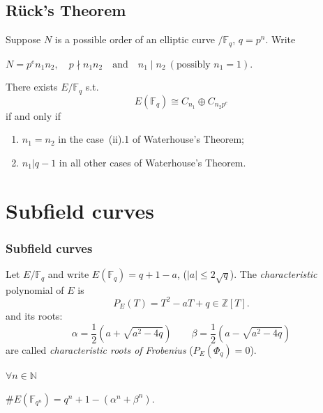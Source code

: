 \documentclass[10pt,handout]{beamer}%
\newcommand{\Z}{\mathbb Z}
\newcommand{\N}{\mathbb N}
\newcommand{\F}{\mathbb F}
\theoremstyle{definition}
\begin{document}
\begin{frame}[label=current]
\end{frame}

\subsection{R\"uck's Theorem}
\begin{frame}
\begin{theorem}[R\"uck]
Suppose $N$ is a possible order of an elliptic curve $/\F_q$,  $q=p^n$.  Write

\centerline{
$N = p^e n_1 n_2,\quad p\nmid n_1 n_2\quad\text{and}\quad n_1\mid n_2\ (\text{possibly }n_1 = 1).$}

There exists $E/\F_q$ s.t.
$$E(\F_q)\cong C_{n_1}\oplus C_{n_2p^e}$$
if and only if
\begin{enumerate}[<+-| alert@+>]
\item $n_1 = n_2$ in the case~(ii).1 of Waterhouse's Theorem;
\item $n_1 |q - 1$ in all other cases of  Waterhouse's Theorem.
\end{enumerate}
\end{theorem}\pause

\begin{example}
\end{example}
\end{frame}

\section{Subfield curves}
\begin{frame}\frametitle{Subfield curves}

\begin{definition}
Let $E/\F_q$ and write $E(\F_q)=q+1-a$, ($|a|\le2\sqrt{q}$). The \emph{characteristic}
polynomial of $E$ is
$$P_E(T)=T^2-aT+q\in\Z[T].$$
and its roots:
$$\alpha=\frac12\left(a+\sqrt{a^2-4q}\right)\qquad\beta=\frac12\left(a-\sqrt{a^2-4q}\right)$$
are called \emph{characteristic roots of Frobenius} ($P_E(\Phi_q)=0$).
\end{definition}

\begin{theorem} $\forall n\in\N$
\centerline{$\#E(\F_{q^n})=q^n+1-(\alpha^n+\beta^n).$}
\end{theorem}
\end{frame}
\end{document}
